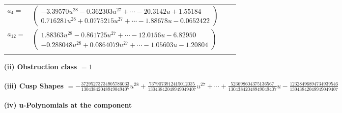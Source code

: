 \documentclass[1p]{elsarticle_modified}
\theoremstyle{definition}
\begin{document}
\begin{tabular}{m{7pt} m{180pt} m{7pt} m{180pt} }
\flushright $a_{4}=$&$\begin{pmatrix}-3.39570 u^{28}-0.362303 u^{27}+\cdots-20.3142 u+1.55184\\0.716281 u^{28}+0.0775215 u^{27}+\cdots-1.88678 u-0.0652422\end{pmatrix}$ \\
\flushright $a_{12}=$&$\begin{pmatrix}1.88363 u^{28}-0.861725 u^{27}+\cdots-12.0156 u-6.82950\\-0.288048 u^{28}+0.0864079 u^{27}+\cdots-1.05603 u-1.20804\end{pmatrix}$\\&\end{tabular}
\flushleft \textbf{(ii) Obstruction class $= 1$}\\~\\
\flushleft \textbf{(iii) Cusp Shapes $= -\frac{37295273734905786033}{13043842048949049407} u^{28}+\frac{7379073912415012035}{13043842048949049407} u^{27}+\cdots+\frac{523698604375136567}{13043842048949049407} u-\frac{12328496894734939546}{13043842048949049407}$}\\~\\
\newpage\renewcommand{\arraystretch}{1}
\flushleft \textbf{(iv) u-Polynomials at the component}\newline \\
\end{document}
